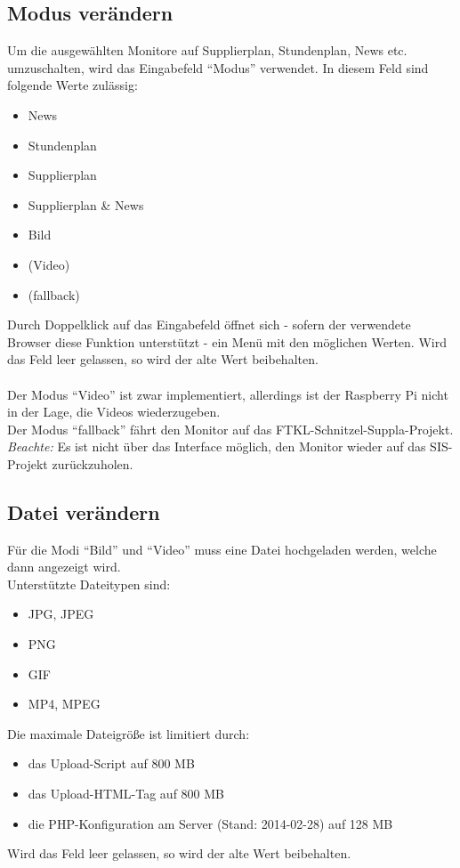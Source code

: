 \subsection{Modus verändern}

Um die ausgewählten Monitore auf Supplierplan, Stundenplan, News etc. umzuschalten, wird das Eingabefeld \enquote{Modus} verwendet. In diesem Feld sind folgende Werte zulässig:
\begin{itemize}
	\item News
	\item Stundenplan
	\item Supplierplan
	\item Supplierplan \& News
	\item Bild
	\item (Video)
	\item (fallback)
\end{itemize}
Durch Doppelklick auf das Eingabefeld öffnet sich - sofern der verwendete Browser diese Funktion unterstützt - ein Menü mit den möglichen Werten. Wird das Feld leer gelassen, so wird der alte Wert beibehalten.\\
\\
Der Modus \enquote{Video} ist zwar implementiert, allerdings ist der Raspberry Pi nicht in der Lage, die Videos wiederzugeben.\\
Der Modus \enquote{fallback} fährt den Monitor auf das FTKL-Schnitzel-Suppla-Projekt. 
\textit{Beachte:} Es ist nicht über das Interface möglich, den Monitor wieder auf das SIS-Projekt zurückzuholen.

\subsection{Datei verändern}

Für die Modi \enquote{Bild} und \enquote{Video} muss eine Datei hochgeladen werden, welche dann angezeigt wird.\\ 
Unterstützte Dateitypen sind:
\begin{itemize}
	\item JPG, JPEG
	\item PNG
	\item GIF
	\item MP4, MPEG
\end{itemize}
Die maximale Dateigröße ist limitiert durch:
\begin{itemize}
	\item das Upload-Script auf 800 MB
	\item das Upload-HTML-Tag auf 800 MB
	\item die PHP-Konfiguration am Server (Stand: 2014-02-28) auf 128 MB
\end{itemize}
Wird das Feld leer gelassen, so wird der alte Wert beibehalten.\\

